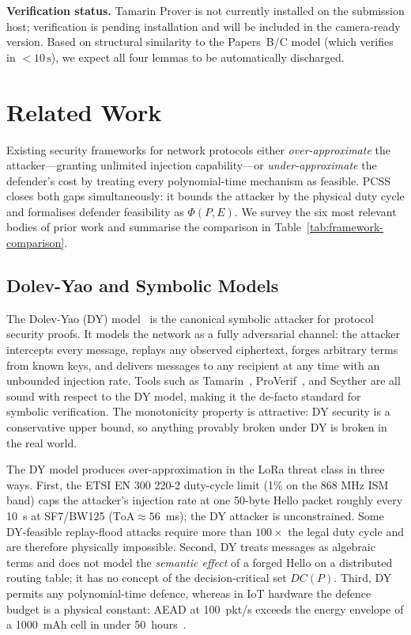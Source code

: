 \documentclass[journal,compsoc]{IEEEtran}
\theoremstyle{plain}
\theoremstyle{definition}
\theoremstyle{remark}
\begin{document}
\textbf{Verification status.}  Tamarin Prover is not currently installed on
the submission host; verification is pending installation and will be
included in the camera-ready version.  Based on structural similarity to the
Papers~B/C model (which verifies in $<10\,\text{s}$), we expect all four
lemmas to be automatically discharged.

\section{Related Work}
\label{sec:related}

Existing security frameworks for network protocols either
\emph{over-approximate} the attacker---granting unlimited injection
capability---or \emph{under-approximate} the defender's cost by treating
every polynomial-time mechanism as feasible.  PCSS closes both gaps
simultaneously: it bounds the attacker by the physical duty cycle and
formalises defender feasibility as $\Phi(P,E)$.  We survey the six most
relevant bodies of prior work and summarise the comparison in
Table~\ref{tab:framework-comparison}.

\subsection{Dolev-Yao and Symbolic Models}

The Dolev-Yao (DY) model~\cite{dolev1983security} is the canonical symbolic
attacker for protocol security proofs.  It models the network as a
fully adversarial channel: the attacker intercepts every message, replays
any observed ciphertext, forges arbitrary terms from known keys, and
delivers messages to any recipient at any time with an unbounded injection
rate.  Tools such as Tamarin~\cite{meier2013tamarin},
ProVerif~\cite{blanchet2016proverif}, and Scyther are all sound with respect
to the DY model, making it the de-facto standard for symbolic verification.
The monotonicity property is attractive: DY security is a conservative upper
bound, so anything provably broken under DY is broken in the real world.

The DY model produces over-approximation in the LoRa threat class in three
ways.  First, the ETSI EN 300 220-2 duty-cycle limit (1\% on the 868 MHz
ISM band) caps the attacker's injection rate at one 50-byte Hello packet
roughly every 10~s at SF7/BW125 ($\text{ToA} \approx 56$~ms); the DY
attacker is unconstrained.  Some DY-feasible replay-flood attacks require
more than $100\times$ the legal duty cycle and are therefore physically
impossible.  Second, DY treats messages as algebraic terms and does not
model the \emph{semantic effect} of a forged Hello on a distributed routing
table; it has no concept of the decision-critical set $\mathit{DC}(P)$.
Third, DY permits any polynomial-time defence, whereas in IoT hardware the
defence budget is a physical constant: AEAD at 100~pkt/s exceeds the energy
envelope of a 1000~mAh cell in under 50~hours~\cite{semtech2020sx1262}.
\end{document}
